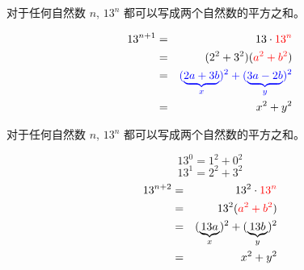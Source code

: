 
\begin{frame}{}
  \begin{theorem}
    对于任何自然数 $n$, $13^{n}$ 都可以写成两个自然数的平方之和。
  \end{theorem}

  \pause
  \begin{eqnarray*}
    13^{n+1} &=& 13 \cdot \textcolor{red}{13^n} \\
    &=& (2^2+3^2)(\textcolor{red}{a^2 + b^2}) \\
    &=& \textcolor{blue}{(\underbrace{2a+3b}_x)^2 + (\underbrace{3a-2b}_y)^2} \\
    &=& x^2+y^2
  \end{eqnarray*}
\end{frame}

\begin{frame}{}
  \begin{theorem}
    对于任何自然数 $n$, $13^{n}$ 都可以写成两个自然数的平方之和。
  \end{theorem}

  \pause
  \[
    13^0 = 1^2 + 0^2
  \]
  \pause
  \[
    13^1 = 2^2 + 3^2
  \]
  \pause
  \begin{eqnarray*}
    13^{n+2} &=& 13^2\cdot \textcolor{red}{13^n} \\
    &=& 13^2(\textcolor{red}{a^2 + b^2}) \\
    &=& (\underbrace{13a}_x)^2 + (\underbrace{13b}_y)^2 \\
    &=& x^2+y^2
  \end{eqnarray*}
\end{frame}

%
%

